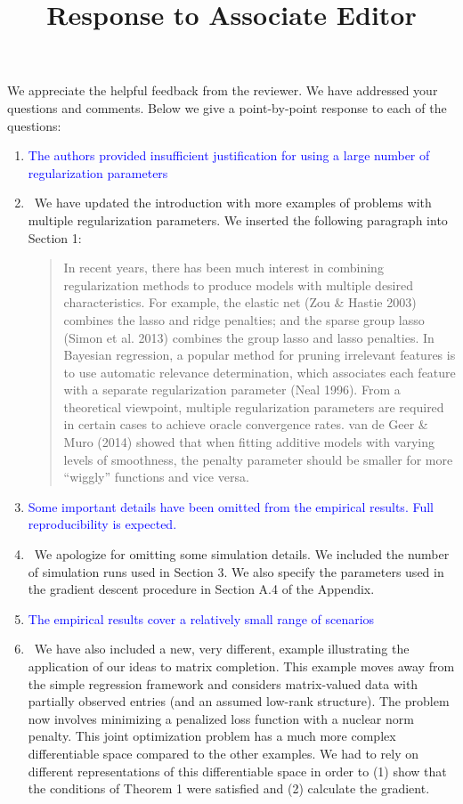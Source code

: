 \documentclass[]{article}
\title{Response to Associate Editor}
\newcommand{\point}[1]{\item \textcolor{blue}{#1}}
\newcommand{\reply}{\item[]\ }
\begin{document}
	\maketitle
		
	We appreciate the helpful feedback from the reviewer. We have addressed your questions and comments. Below we give a point-by-point response to each of the questions:
		
	\begin{enumerate}
		\point{The authors provided insufficient justification for using a large number of regularization parameters}

		\reply  We have updated the introduction with more examples of problems with multiple regularization parameters. We inserted the following paragraph into Section 1:
		
		\begin{quote}
			In recent years, there has been much interest in combining regularization methods to produce models with multiple desired characteristics. For example, the elastic net (Zou \& Hastie 2003) combines the lasso and ridge penalties; and the sparse group lasso (Simon et al. 2013) combines the group lasso and lasso penalties. In Bayesian regression, a popular method for pruning irrelevant features is to use automatic relevance determination, which associates each feature with a separate regularization parameter (Neal 1996). From a theoretical viewpoint, multiple regularization parameters are required in certain cases to achieve oracle convergence rates. van de Geer \& Muro (2014) showed that when fitting additive models with varying levels of smoothness, the penalty parameter should be smaller for more ``wiggly'' functions and vice versa. 
		\end{quote}
		
		\point{Some important details have been omitted from the empirical results. Full reproducibility is expected.}
		
		\reply We apologize for omitting some simulation details. We included the number of simulation runs used in Section 3. We also specify the parameters used in the gradient descent procedure in Section A.4 of the Appendix.
		
		\point{The empirical results cover a relatively small range of scenarios}
		
		\reply We have also included a new, very different, example illustrating the application of our ideas to matrix completion. This example moves away from the simple regression framework and considers matrix-valued data with partially observed entries (and an assumed low-rank structure). The problem now involves minimizing a penalized loss function with a nuclear norm penalty. This joint optimization problem has a much more complex differentiable space compared to the other examples. We had to rely on different representations of this differentiable space in order to (1) show that the conditions of Theorem 1 were satisfied and (2) calculate the gradient. 
		

\end{enumerate}
\end{document}
